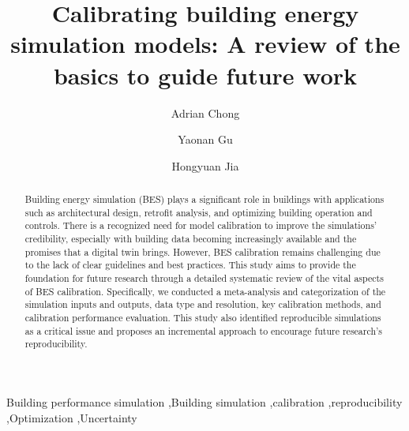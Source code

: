 \documentclass[review]{elsarticle}
\begin{document}
\begin{frontmatter}



\title{Calibrating building energy simulation models: A review of the basics to guide future work}


\author[add1]{Adrian Chong}
\author[add1]{Yaonan Gu}
\author[add2,add3]{Hongyuan Jia}

\address[add1]{Department of the Built Environment, School of Design and Environment, National University of Singapore, 4 Architecture Drive, Singapore 117566, Singapore}
\address[add2]{School of Civil Engineering and Architecture, Chongqing University of Science and Technology, Chongqing 401331, China}
\address[add3]{SinBerBEST Program, Berkeley Education Alliance for Research in Singapore, Singapore, 138602, Singapore}

\begin{abstract}
Building energy simulation (BES) plays a significant role in buildings with applications such as architectural design, retrofit analysis, and optimizing building operation and controls. There is a recognized need for model calibration to improve the simulations' credibility, especially with building data becoming increasingly available and the promises that a digital twin brings. However, BES calibration remains challenging due to the lack of clear guidelines and best practices. This study aims to provide the foundation for future research through a detailed systematic review of the vital aspects of BES calibration. Specifically, we conducted a meta-analysis and categorization of the simulation inputs and outputs, data type and resolution, key calibration methods, and calibration performance evaluation. This study also identified reproducible simulations as a critical issue and proposes an incremental approach to encourage future research's reproducibility. 

\end{abstract}

\begin{keyword}
Building performance simulation \sep Building simulation \sep calibration \sep reproducibility \sep Optimization \sep Uncertainty
\end{keyword}

\end{frontmatter}
\end{document}
